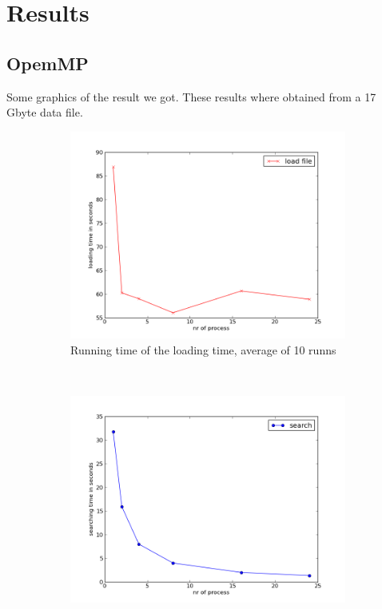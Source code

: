 \documentclass[a4paper,10pt]{article}
\begin{document}
\section{Results}

\subsection{OpemMP}
 
Some graphics of the result we got. These results where obtained from a 17 Gbyte data file.
\begin{figure}[h!]
        \centering
        \begin{subfigure}[b]{0.48\textwidth}
                \centering
                \includegraphics[width=\textwidth]{graphics/openmp_load_data.png}
                \caption{Running time of the loading time, average of 10 runns}
                \label{fig:gull}
        \end{subfigure}%
\\
        \begin{subfigure}[b]{0.48\textwidth}
                \centering
                \includegraphics[width=\textwidth]{graphics/openmp_searching_time.png}

\end{subfigure}
\end{figure}
\end{document}
